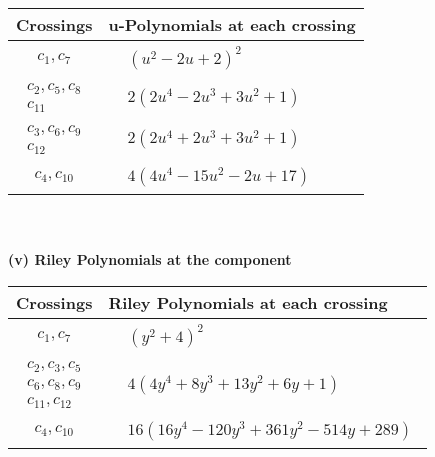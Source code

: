 \documentclass[1p]{elsarticle_modified}
\theoremstyle{definition}
\begin{document}
\begin{tabular}{m{50pt}|m{274pt}}
Crossings & \hspace{64pt}u-Polynomials at each crossing \\
\hline $$\begin{aligned}c_{1},c_{7}\end{aligned}$$&$\begin{aligned}
&(u^2-2 u+2)^2
\end{aligned}$\\
\hline $$\begin{aligned}c_{2},c_{5},c_{8}\\c_{11}\end{aligned}$$&$\begin{aligned}
&2(2 u^4-2 u^3+3 u^2+1)
\end{aligned}$\\
\hline $$\begin{aligned}c_{3},c_{6},c_{9}\\c_{12}\end{aligned}$$&$\begin{aligned}
&2(2 u^4+2 u^3+3 u^2+1)
\end{aligned}$\\
\hline $$\begin{aligned}c_{4},c_{10}\end{aligned}$$&$\begin{aligned}
&4(4 u^4-15 u^2-2 u+17)
\end{aligned}$\\
\hline
\end{tabular}\\~\\
\newpage\renewcommand{\arraystretch}{1}
\flushleft \textbf{(v) Riley Polynomials at the component}\newline \\
\begin{tabular}{m{50pt}|m{274pt}}
Crossings & \hspace{64pt}Riley Polynomials at each crossing \\
\hline $$\begin{aligned}c_{1},c_{7}\end{aligned}$$&$\begin{aligned}
&(y^2+4)^2
\end{aligned}$\\
\hline $$\begin{aligned}c_{2},c_{3},c_{5}\\c_{6},c_{8},c_{9}\\c_{11},c_{12}\end{aligned}$$&$\begin{aligned}
&4(4 y^4+8 y^3+13 y^2+6 y+1)
\end{aligned}$\\
\hline $$\begin{aligned}c_{4},c_{10}\end{aligned}$$&$\begin{aligned}
&16(16 y^4-120 y^3+361 y^2-514 y+289)
\end{aligned}$\\
\hline
\end{tabular}\\~\\
\end{document}
